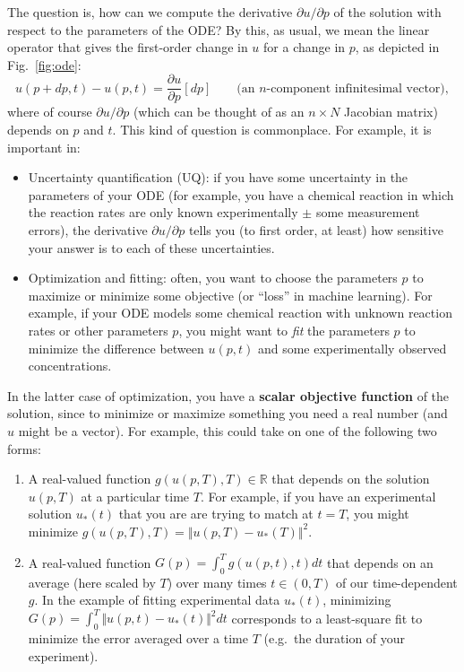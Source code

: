 The question is, how can we compute the derivative $\partial u/\partial p$
of the solution with respect to the parameters of the ODE? By this,
as usual, we mean the linear operator that gives the first-order change
in $u$ for a change in $p$, as depicted in Fig.~\ref{fig:ode}:
\[
u(p+dp,t)-u(p,t)=\frac{\partial u}{\partial p}[dp] \qquad \mbox{(an }n\mbox{-component infinitesimal vector)},
\]
where of course $\partial u/\partial p$ (which can be thought of as an $n \times N$ Jacobian matrix) depends on $p$ and $t$.
This kind of question is commonplace. For example, it is important
in:
\begin{itemize}
\item Uncertainty quantification (UQ): if you have some uncertainty in the
parameters of your ODE (for example, you have a chemical reaction
in which the reaction rates are only known experimentally $\pm$ some
measurement errors), the derivative $\partial u/\partial p$ tells
you (to first order, at least) how sensitive your answer is to
each of these uncertainties.
\item Optimization and fitting: often, you want to choose the parameters
$p$ to maximize or minimize some objective (or ``loss'' in machine
learning). For example, if your ODE models some chemical reaction
with unknown reaction rates or other parameters $p$, you might want
to \emph{fit }the parameters $p$ to minimize the difference between
$u(p,t)$ and some experimentally observed concentrations.
\end{itemize}
In the latter case of optimization, you have a \textbf{scalar objective
function} of the solution, since to minimize or maximize something
you need a real number (and $u$ might be a vector). For example,
this could take on one of the following two forms:
\begin{enumerate}
\item A real-valued function $g(u(p,T),T) \in \mathbb{R}$ that depends on the solution $u(p,T)$ at
a particular time $T$. For example, if you have an experimental solution
$u_{*}(t)$ that you are are trying to match at $t=T$, you might
minimize $g(u(p,T),T)=\Vert u(p,T)-u_{*}(T)\Vert^{2}$. 
\item A real-valued function $G(p)=\int_{0}^{T}g(u(p,t),t)dt$ that depends on an average (here scaled by $T$)
over many times $t\in(0,T)$ of our time-dependent $g$. In the example
of fitting experimental data $u_{*}(t)$, minimizing $G(p)=\int_{0}^{T}\Vert u(p,t)-u_{*}(t)\Vert^{2}dt$
corresponds to a least-square fit to minimize the error averaged over
a time $T$ (e.g.~the duration of your experiment).
\end{enumerate}


